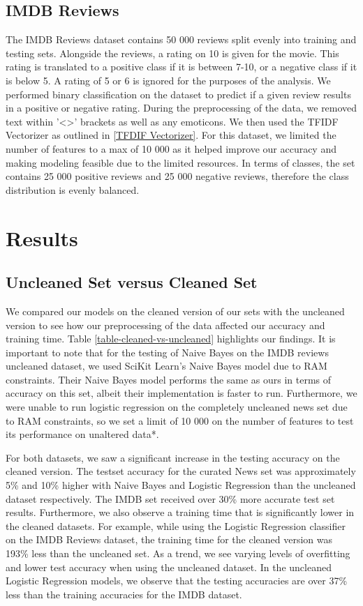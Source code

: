 \documentclass[11pt]{homework}
\begin{document}
\subsection{IMDB Reviews}
The IMDB Reviews dataset contains 50 000 reviews split evenly into training and testing sets. Alongside the reviews, a rating on 10 is given for the movie. This rating is translated to a positive class if it is between 7-10, or a negative class if it is below 5. A rating of 5 or 6 is ignored for the purposes of the analysis. We performed binary classification on the dataset to predict if a given review results in a positive or negative rating. During the preprocessing of the data, we removed text within '<>' brackets as well as any emoticons. We then used the TFIDF Vectorizer as outlined in \ref{TFDIF Vectorizer}. For this dataset, we limited the number of features to a max of 10 000 as it helped improve our accuracy and making modeling feasible due to the limited resources. In terms of classes, the set contains 25 000 positive reviews and 25 000 negative reviews, therefore the class distribution is evenly balanced.

\section{Results}

\subsection{Uncleaned Set versus Cleaned Set}
We compared our models on the cleaned version of our sets with the uncleaned version to see how our preprocessing of the data affected our accuracy and training time. Table \ref{table-cleaned-vs-uncleaned} highlights our findings. It is important to note that for the testing of Naive Bayes on the IMDB reviews uncleaned dataset, we used SciKit Learn's Naive Bayes model due to RAM constraints. Their Naive Bayes model performs the same as ours in terms of accuracy on this set, albeit their implementation is faster to run. Furthermore, we were unable to run logistic regression on the completely uncleaned news set due to RAM constraints, so we set a limit of 10 000 on the number of features to test its performance on unaltered data*. 

For both datasets, we saw a significant increase in the testing accuracy on the cleaned version. The testset accuracy for the curated News set was approximately 5\% and 10\% higher with Naive Bayes and Logistic Regression than the uncleaned dataset  respectively. The IMDB set received over 30\% more accurate test set results. Furthermore, we also observe a training time that is significantly lower in the cleaned datasets. For example, while using the Logistic Regression classifier on the IMDB Reviews dataset, the training time for the cleaned version was 193\% less than the uncleaned set. As a trend, we see varying levels of overfitting and lower test accuracy when using the uncleaned dataset. In the uncleaned Logistic Regression models, we observe that the testing accuracies are over 37\% less than the training accuracies for the IMDB dataset.
\end{document}
